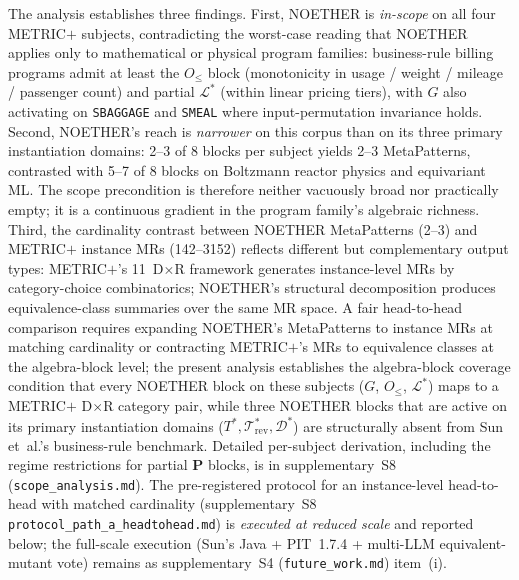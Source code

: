 \documentclass[manuscript]{acmart}
\newcommand{\tildemark}{\textbf{P}}
\begin{document}
The analysis establishes three findings. First, NOETHER is
\emph{in-scope} on all four METRIC$+$ subjects, contradicting the
worst-case reading that NOETHER applies only to mathematical or
physical program families: business-rule billing programs admit at
least the $O_{\le}$ block (monotonicity in usage / weight / mileage /
passenger count) and partial $\mathcal{L}^{*}$ (within linear pricing
tiers), with $G$ also activating on \texttt{SBAGGAGE} and
\texttt{SMEAL} where input-permutation invariance holds. Second,
NOETHER's reach is \emph{narrower} on this corpus than on its three
primary instantiation domains: 2--3 of 8 blocks per subject yields
2--3 MetaPatterns, contrasted with 5--7 of 8 blocks on Boltzmann
reactor physics and equivariant ML. The scope precondition is
therefore neither vacuously broad nor practically empty; it is a
continuous gradient in the program family's algebraic richness.
Third, the cardinality contrast between NOETHER MetaPatterns (2--3)
and METRIC$+$ instance MRs (142--3152) reflects different but
complementary output types: METRIC$+$'s 11~D$\times$R framework
generates instance-level MRs by category-choice combinatorics;
NOETHER's structural decomposition produces equivalence-class
summaries over the same MR space. A fair head-to-head comparison
requires expanding NOETHER's MetaPatterns to instance MRs at
matching cardinality or contracting METRIC$+$'s MRs to equivalence
classes at the algebra-block level; the present analysis establishes
the algebra-block coverage condition that every NOETHER block on
these subjects ($G$, $O_{\le}$, $\mathcal{L}^{*}$) maps to a
METRIC$+$ D$\times$R category pair, while three NOETHER blocks that
are active on its primary instantiation domains
($T^{*}, \mathcal{T}^{*}_{\mathrm{rev}}, \mathcal{D}^{*}$) are
structurally absent from Sun et~al.'s business-rule benchmark.
Detailed per-subject derivation, including the regime restrictions
for partial \tildemark{} blocks, is in supplementary~S8
(\texttt{scope\_analysis.md}). The pre-registered protocol for an
instance-level head-to-head with matched cardinality
(supplementary~S8 \texttt{protocol\_path\_a\_headtohead.md}) is
\emph{executed at reduced scale} and reported below;
the full-scale execution (Sun's Java + PIT~1.7.4 + multi-LLM
equivalent-mutant vote) remains as supplementary~S4 (\texttt{future\_work.md})
item~(i).
\end{document}
